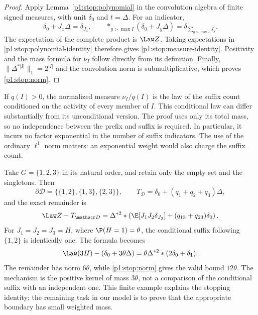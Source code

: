 \begin{proof}
Apply Lemma~\ref{p1:stop:polynomial} in the convolution algebra
of finite signed measures, with unit $\delta_0$ and $t=\Delta$.
For an indicator,
\[
 \delta_0+J_x\Delta=\delta_{J_x},
 \qquad
 \mathop{*}_{y>\max I}(\delta_0+J_y\Delta)
       =\delta_{\sum_{y>\max I}J_y}.
\]
The expectation of the complete product is $\Law Z$.
Taking expectations in \eqref{p1:stop:polynomial-identity}
therefore gives \eqref{p1:stop:measure-identity}.
Positivity and the mass formula for $\nu_I$ follow directly
from its definition.  Finally,
$\|\Delta^{*|I|}\|_1=2^{|I|}$ and the convolution norm is
submultiplicative, which proves \eqref{p1:stop:norm}.
\end{proof}

If $q(I)>0$, the normalized measure $\nu_I/q(I)$ is the law
of the suffix count conditioned on the activity of every member
of $I$.  This conditional law can differ substantially from its
unconditional version.  The proof uses only its total mass,
so no independence between the prefix and suffix is required.
In particular, it incurs no factor exponential in the number
of suffix indicators.
The use of the ordinary $\ell^1$ norm matters: an exponential
weight would also charge the suffix count.

\begin{example}
\label{p1:stop:example}
Take $G=\{1,2,3\}$ in its natural order, and retain only the empty
set and the singletons.  Then
\[
 \partial\mathscr D=\{\{1,2\},\{1,3\},\{2,3\}\},
 \qquad
 T_{\mathscr D}=\delta_0+(q_1+q_2+q_3)\Delta,
\]
and the exact remainder is
\[
 \Law Z-T_{\mathscr D}
 =\Delta^{*2}*
   \left(\E[J_1J_2\delta_{J_3}]
               +(q_{13}+q_{23})\delta_0\right).
\]
For $J_1=J_2=J_3=H$, where $\P(H=1)=\theta$, the conditional
suffix following $\{1,2\}$ is identically one.  The formula becomes
\[
 \Law(3H)-(\delta_0+3\theta\Delta)
    =\theta\Delta^{*2}*(2\delta_0+\delta_1).
\]
The remainder has norm $6\theta$, while
\eqref{p1:stop:norm} gives the valid bound $12\theta$.
The mechanism is the positive kernel of mass $3\theta$, not
a comparison of the conditional suffix with an independent one.
This finite example explains the stopping identity; the remaining
task in our model is to prove that the appropriate boundary has
small weighted mass.
\end{example}
